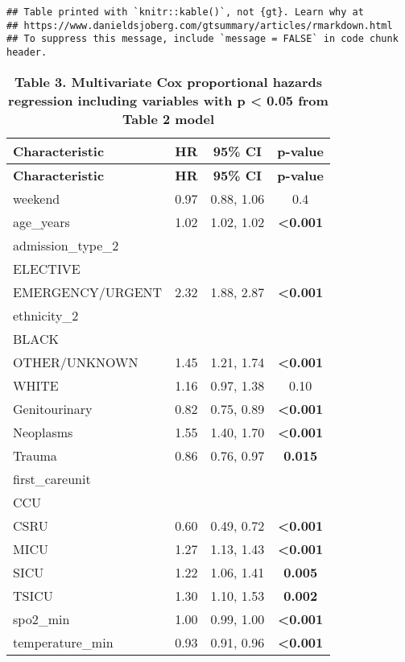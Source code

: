 \documentclass[
]{article}
\begin{document}
\begin{verbatim}
## Table printed with `knitr::kable()`, not {gt}. Learn why at
## https://www.danieldsjoberg.com/gtsummary/articles/rmarkdown.html
## To suppress this message, include `message = FALSE` in code chunk header.
\end{verbatim}

\begin{longtable}[]{@{}lccc@{}}
\caption{\textbf{Table 3. Multivariate Cox proportional hazards
regression including variables with p \textless{} 0.05 from Table 2
model}}\tabularnewline
\toprule\noalign{}
\textbf{Characteristic} & \textbf{HR} & \textbf{95\% CI} &
\textbf{p-value} \\
\midrule\noalign{}
\endfirsthead
\toprule\noalign{}
\textbf{Characteristic} & \textbf{HR} & \textbf{95\% CI} &
\textbf{p-value} \\
\midrule\noalign{}
\endhead
\bottomrule\noalign{}
\endlastfoot
weekend & 0.97 & 0.88, 1.06 & 0.4 \\
age\_years & 1.02 & 1.02, 1.02 & \textbf{\textless0.001} \\
admission\_type\_2 & & & \\
ELECTIVE & & & \\
EMERGENCY/URGENT & 2.32 & 1.88, 2.87 & \textbf{\textless0.001} \\
ethnicity\_2 & & & \\
BLACK & & & \\
OTHER/UNKNOWN & 1.45 & 1.21, 1.74 & \textbf{\textless0.001} \\
WHITE & 1.16 & 0.97, 1.38 & 0.10 \\
Genitourinary & 0.82 & 0.75, 0.89 & \textbf{\textless0.001} \\
Neoplasms & 1.55 & 1.40, 1.70 & \textbf{\textless0.001} \\
Trauma & 0.86 & 0.76, 0.97 & \textbf{0.015} \\
first\_careunit & & & \\
CCU & & & \\
CSRU & 0.60 & 0.49, 0.72 & \textbf{\textless0.001} \\
MICU & 1.27 & 1.13, 1.43 & \textbf{\textless0.001} \\
SICU & 1.22 & 1.06, 1.41 & \textbf{0.005} \\
TSICU & 1.30 & 1.10, 1.53 & \textbf{0.002} \\
spo2\_min & 1.00 & 0.99, 1.00 & \textbf{\textless0.001} \\
temperature\_min & 0.93 & 0.91, 0.96 & \textbf{\textless0.001} \\

\end{longtable}
\end{document}
